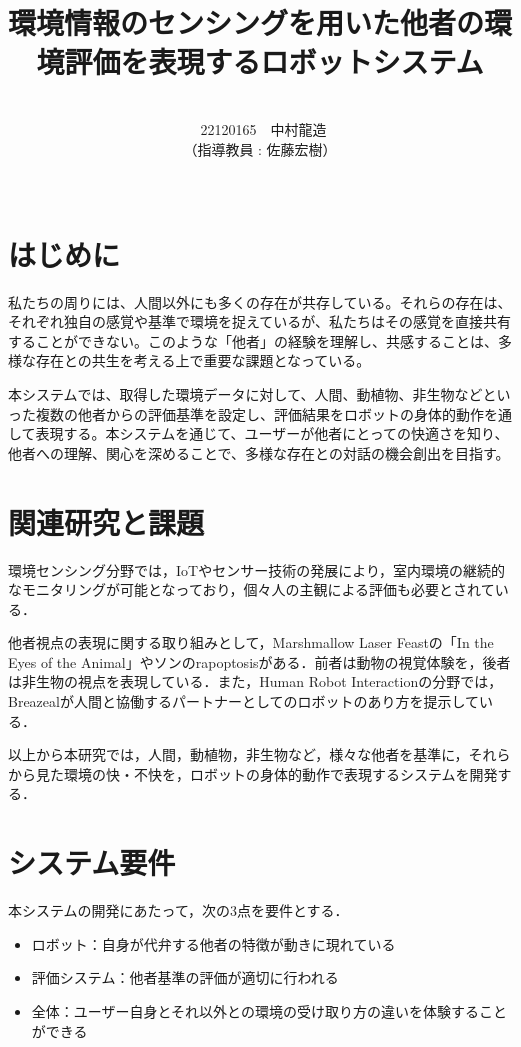 \documentclass[paper=a4paper,jafontsize=9pt,head_space=15mm,gutter=20mm,
twocolumn,number_of_lines=49, line_length=26zw]{myuarticle}
\begin{document}
\title{{\LARGE\bfseries\gtfamily 環境情報のセンシングを用いた他者の環境評価を表現するロボットシステム}}
\author{\\\ 22120165　中村龍造 \\ （指導教員 : 佐藤宏樹）\\ \\}
\date{}
\maketitle

\section{はじめに}
私たちの周りには、人間以外にも多くの存在が共存している。それらの存在は、それぞれ独自の感覚や基準で環境を捉えているが、私たちはその感覚を直接共有することができない。このような「他者」の経験を理解し、共感することは、多様な存在との共生を考える上で重要な課題となっている。

本システムでは、取得した環境データに対して、人間、動植物、非生物などといった複数の他者からの評価基準を設定し、評価結果をロボットの身体的動作を通して表現する。本システムを通じて、ユーザーが他者にとっての快適さを知り、他者への理解、関心を深めることで、多様な存在との対話の機会創出を目指す。

\section{関連研究と課題}

環境センシング分野では，IoTやセンサー技術の発展により，室内環境の継続的なモニタリングが可能となっており\cite{Saini-2020-IndoorAirQualityMonitoring}，個々人の主観による評価も必要とされている\cite{Coulby-2020-ScopingReviewTechnologicalApproaches}．

他者視点の表現に関する取り組みとして，Marshmallow Laser Feastの「In the Eyes of the
Animal」\cite{Dezeen-2015-MarshmallowLaserFeastsEyes}やソンのrapoptosis\cite{--ソンヨン}がある．前者は動物の視覚体験を，後者は非生物の視点を表現している．また，Human
Robot
Interactionの分野では，Breazeal\cite{C.Breazeal-2004-SocialInteractionsHRIRobot}が人間と協働するパートナーとしてのロボットのあり方を提示している．

以上から本研究では，人間，動植物，非生物など，様々な他者を基準に，それらから見た環境の快・不快を，ロボットの身体的動作で表現するシステムを開発する．

\section{システム要件}
本システムの開発にあたって，次の3点を要件とする．
\begin{itemize}
  \item ロボット：自身が代弁する他者の特徴が動きに現れている
  \item 評価システム：他者基準の評価が適切に行われる
  \item 全体：ユーザー自身とそれ以外との環境の受け取り方の違いを体験することができる
\end{itemize}
\end{document}
